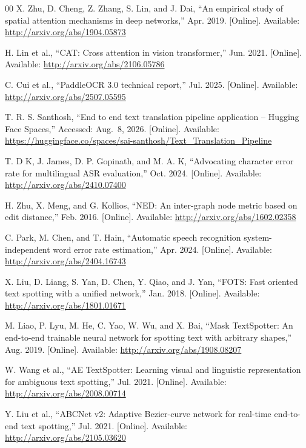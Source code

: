 \documentclass{ieeeaccess}
\begin{document}
{\begin{thebibliography}{00}
 X. Zhu, D. Cheng, Z. Zhang, S. Lin, and J. Dai, ``An empirical
  study of spatial attention mechanisms in deep networks,'' Apr. 2019.
  [Online]. Available: \url{http://arxiv.org/abs/1904.05873}

 H. Lin et al., ``CAT: Cross attention in vision transformer,''
  Jun. 2021. [Online]. Available: \url{http://arxiv.org/abs/2106.05786}

 C. Cui et al., ``PaddleOCR 3.0 technical report,'' Jul. 2025.
  [Online]. Available: \url{http://arxiv.org/abs/2507.05595}

 T. R. S. Santhosh, ``End to end text translation pipeline
  application -- Hugging Face Spaces,'' Accessed: Aug.~8, 2026. [Online].
  Available:
  \url{https://huggingface.co/spaces/sai-santhosh/Text_Translation_Pipeline}

 T. D K, J. James, D. P. Gopinath, and M. A. K,
  ``Advocating character error rate for multilingual ASR evaluation,''
  Oct. 2024. [Online]. Available:
  \url{http://arxiv.org/abs/2410.07400}

 H. Zhu, X. Meng, and G. Kollios, ``NED: An inter-graph node metric
  based on edit distance,'' Feb. 2016. [Online]. Available:
  \url{http://arxiv.org/abs/1602.02358}

 C. Park, M. Chen, and T. Hain, ``Automatic speech recognition
  system-independent word error rate estimation,'' Apr. 2024. [Online].
  Available: \url{http://arxiv.org/abs/2404.16743}

 X. Liu, D. Liang, S. Yan, D. Chen, Y. Qiao, and J. Yan,
  ``FOTS: Fast oriented text spotting with a unified network,'' Jan. 2018.
  [Online]. Available: \url{http://arxiv.org/abs/1801.01671}

 M. Liao, P. Lyu, M. He, C. Yao, W. Wu, and X. Bai,
  ``Mask TextSpotter: An end-to-end trainable neural network for spotting text
  with arbitrary shapes,'' Aug. 2019. [Online]. Available:
  \url{http://arxiv.org/abs/1908.08207}

 W. Wang et al., ``AE TextSpotter: Learning visual and linguistic
  representation for ambiguous text spotting,'' Jul. 2021. [Online]. Available:
  \url{http://arxiv.org/abs/2008.00714}

 Y. Liu et al., ``ABCNet v2: Adaptive Bezier-curve network for
  real-time end-to-end text spotting,'' Jul. 2021. [Online]. Available:
  \url{http://arxiv.org/abs/2105.03620}


\end{thebibliography}}
\end{document}
